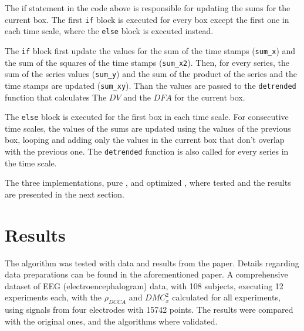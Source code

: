 \documentclass[article]{jss}
\begin{document}
The if statement in the code above is responsible for updating the sums for the current box. The first \verb"if" block is executed for
every box except the first one in each time scale, where the \verb"else" block is executed instead. 

The \verb"if" block first update the values for the sum of the time stamps (\verb"sum_x") and the sum of the squares of the time stamps (\verb"sum_x2"). Then, for every series, the sum of the series values (\verb"sum_y") and the sum of the product of the series and the time stamps are updated (\verb"sum_xy"). Than the values are passed to the \verb"detrended" function that calculates The $DV$ and the $DFA$ for the current box.

The \verb"else" block is executed for the first box in each time scale. For consecutive time scales, the values of the sums are updated using the values of the previous box, looping and adding only the values in the current box that don't overlap with the previous one. The \verb"detrended" function is also called for every series in the time scale.

The three implementations, pure ,  and optimized , where tested and the results are presented in the next section.
 


\section{Results} \label{sec:results}

The algorithm was tested with data and results from the \cite{RIBEIRO2025107419} paper. Details regarding data preparations can be found in the aforementioned paper. A comprehensive dataset of EEG (electroencephalogram) data, with 108 subjects, executing 12 experiments each, with the $\rho_{DCCA}$ and $DMC_{x}^{2}$ calculated for all experiments, using signals from four electrodes with 15742 points. The results were compared with the original ones, and the algorithms where validated.
\end{document}
